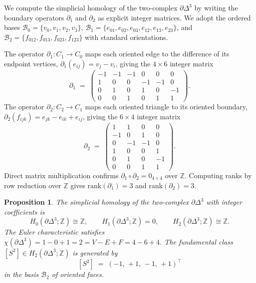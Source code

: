 \documentclass[11pt,a4paper]{article}
\newtheorem{proposition}[theorem]{Proposition}
\theoremstyle{definition}
\newcommand{\Sfour}{\partial\Delta^3}
\newcommand{\Hk}[1]{H_{#1}}
\newcommand{\rank}{\mathrm{rank}}
\begin{document}
We compute the simplicial homology of the two-complex $\Sfour$ by writing the boundary operators $\partial_1$ and $\partial_2$ as explicit integer matrices. We adopt the ordered bases $\mathcal{B}_0 = \{v_0, v_1, v_2, v_3\}$, $\mathcal{B}_1 = \{e_{01}, e_{02}, e_{03}, e_{12}, e_{13}, e_{23}\}$, and $\mathcal{B}_2 = \{f_{012}, f_{013}, f_{023}, f_{123}\}$ with standard orientations.

The operator $\partial_1 : C_1 \to C_0$ maps each oriented edge to the difference of its endpoint vertices, $\partial_1(e_{ij}) = v_j - v_i$, giving the $4 \times 6$ integer matrix
\[
  \partial_1 \;=\;
  \begin{pmatrix}
    -1 & -1 & -1 &  0 &  0 &  0 \\
     1 &  0 &  0 & -1 & -1 &  0 \\
     0 &  1 &  0 &  1 &  0 & -1 \\
     0 &  0 &  1 &  0 &  1 &  1
  \end{pmatrix}.
\]
The operator $\partial_2 : C_2 \to C_1$ maps each oriented triangle to its oriented boundary, $\partial_2(f_{ijk}) = e_{jk} - e_{ik} + e_{ij}$, giving the $6 \times 4$ integer matrix
\[
  \partial_2 \;=\;
  \begin{pmatrix}
     1 &  1 &  0 &  0 \\
    -1 &  0 &  1 &  0 \\
     0 & -1 & -1 &  0 \\
     1 &  0 &  0 &  1 \\
     0 &  1 &  0 & -1 \\
     0 &  0 &  1 &  1
  \end{pmatrix}.
\]
Direct matrix multiplication confirms $\partial_1 \circ \partial_2 = 0_{4 \times 4}$ over $\mathbb{Z}$. Computing ranks by row reduction over $\mathbb{Z}$ gives $\rank(\partial_1) = 3$ and $\rank(\partial_2) = 3$.

\begin{proposition}
  \label{prop:homology_S2}
  The simplicial homology of the two-complex $\Sfour$ with integer coefficients is
  \[
    \Hk{0}(\Sfour;\mathbb{Z}) \cong \mathbb{Z}, \qquad
    \Hk{1}(\Sfour;\mathbb{Z}) = 0, \qquad
    \Hk{2}(\Sfour;\mathbb{Z}) \cong \mathbb{Z}.
  \]
  The Euler characteristic satisfies $\chi(\Sfour) = 1 - 0 + 1 = 2 = V - E + F = 4 - 6 + 4$. The fundamental class $[S^2] \in \Hk{2}(\Sfour;\mathbb{Z})$ is generated by
  \[
    [S^2] \;=\; (-1,\, +1,\, -1,\, +1)^{\!\top}
  \]
  in the basis $\mathcal{B}_2$ of oriented faces.
\end{proposition}
\end{document}
